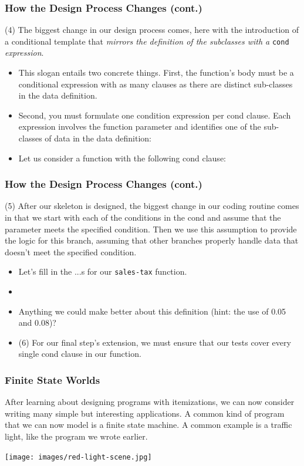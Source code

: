 \documentclass{beamer}
\begin{document}
\begin{frame}
  \frametitle{How the Design Process Changes (cont.)}
  (4) The biggest change in our design process comes, here with the introduction of a conditional template that \emph{mirrors the definition
    of the subclasses with a} \texttt{cond} \emph{expression}.
  \begin{itemize}
  \item<2-> This slogan entails two concrete things. First, the function’s body must be a conditional expression with as many clauses as there are distinct sub-classes in the data definition.
  \item<3->  Second, you must formulate one condition expression per cond clause. Each expression involves the function parameter and identifies one of the sub-classes of data in the data definition:
  \item<4-> Let us consider a function with the following cond clause:
    \taxSkeleton
  \end{itemize}
\end{frame}

\begin{frame}
  \frametitle{How the Design Process Changes (cont.)}
  (5) After our skeleton is designed, the biggest change in our coding routine comes in that we start with each of the conditions in the cond and assume
  that the parameter meets the specified condition. Then we use this assumption to provide the logic for this branch, assuming that other branches properly
  handle data that doesn't meet the specified condition.
  \begin{itemize}
  \item<2-> Let's fill in the ...s for our \texttt{sales-tax} function.
  \item<3-> \taxFull
  \item<4-> Anything we could make better about this definition (hint: the use of 0.05 and 0.08)?
  \item<5-> (6) For our final step's extension, we must ensure that our tests cover every single cond clause in our function.
  \end{itemize}
\end{frame}

\begin{frame}
  \frametitle{Finite State Worlds}
  After learning about designing programs with itemizations, we can now
  consider writing many simple but interesting applications. A common
  kind of program that we can now model is a finite state machine.
  A common example is a traffic light, like the program we wrote earlier.
  \pause
  \begin{center}
    \texttt{[image: images/red-light-scene.jpg]}
  \end{center}
\end{frame}
\end{document}
